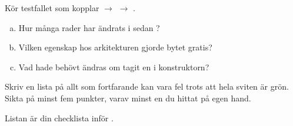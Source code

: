 \label{ex:11:4}
Kör testfallet som kopplar  $\rightarrow$  $\rightarrow$
.
\begin{enumerate}[a)]
  \item Hur många rader har ändrats i  sedan ?
  \item Vilken egenskap hos arkitekturen gjorde bytet gratis?
  \item Vad hade behövt ändras om  tagit en  i
    konstruktorn?
\end{enumerate}

\label{ex:11:5}
Skriv en lista på allt som fortfarande kan vara fel trots att hela sviten är grön. Sikta på minst
fem punkter, varav minst en du hittat på egen hand.

Listan är din checklista inför .
